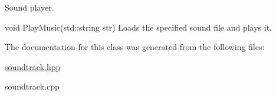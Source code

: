 Sound player. 

void Play\+Music(std\+::string str) Loads the specified sound file and plays it. 

The documentation for this class was generated from the following files\+:\begin{DoxyCompactItemize}
\item 
\hyperlink{soundtrack_8hpp}{soundtrack.\+hpp}\item 
soundtrack.\+cpp\end{DoxyCompactItemize}
